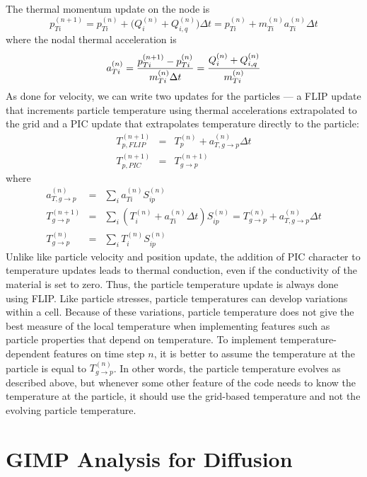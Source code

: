 \documentclass[11pt]{article}
\begin{document}
The thermal momentum update on the node is
\begin{equation}
     p_{Ti}^{(n+1)} = p_{Ti}^{(n)} +  \bigl(Q_{i}^{(n)} + Q_{i,q}^{(n)}\bigr)\Delta t = p_{Ti}^{(n)} +  m_{Ti}^{(n)} a_{Ti}^{(n)}\Delta t
\end{equation}
where the nodal thermal acceleration is
\begin{equation}
    a_{Ti}^{(n)} = {p_{Ti}^{(n+1)}- p_{Ti}^{(n)} \over m_{Ti}^{(n)}\Delta t}
         =  { Q_{i}^{(n)} + Q_{i,q}^{(n)}  \over m_{Ti}^{(n)}}
\end{equation}
As done for velocity, we can write two updates  for the particles --- a FLIP update that increments particle temperature using thermal accelerations extrapolated to the grid and a PIC update that extrapolates temperature directly to the particle:
\begin{eqnarray}
     T_{p,FLIP}^{(n+1)}  & = & T_p^{(n)} + a_{T,g\to p}^{(n)}\Delta t   \\
     T_{p,PIC}^{(n+1)}  & = & T_{g\to p}^{(n+1)}
\end{eqnarray}
where
\begin{eqnarray}
   a_{T,g\to p}^{(n)} & = & \sum_i a_{Ti}^{(n)} S_{ip}^{(n)}    \\
   T_{g\to p}^{(n+1)} & = & 
          \sum_i  \left(T_i^{(n)}+a_{Ti}^{(n)}\Delta t\right) S_{ip}^{(n)} 
          = T_{g\to p}^{(n)} + a_{T,g\to p}^{(n)}\Delta t  \\
    T_{g\to p}^{(n)} & = &  \sum_i T_i^{(n)}S_{ip}^{(n)} 
\end{eqnarray}
Unlike like particle velocity and position update, the addition of PIC character to temperature updates leads to thermal conduction, even if the conductivity of the material is set to zero. Thus, the particle temperature update is always done using FLIP. Like particle stresses, particle temperatures can develop variations within a cell. Because of these variations, particle temperature does not give the best measure of the local temperature when implementing features such as particle properties that depend on temperature. To implement temperature-dependent features on time step $n$, it is better to assume the temperature at the particle is equal to $T_{g\to p}^{(n)}$. In other words, the particle temperature evolves as described above, but whenever some other feature of the code needs to know the temperature at the particle, it should use the grid-based temperature and not the evolving particle temperature.

\section{GIMP Analysis for Diffusion}
\end{document}
